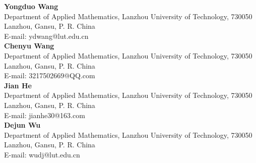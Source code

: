 \documentclass[11pt, twoside]{article}
\begin{document}
\textbf{Yongduo Wang}\\
Department of Applied Mathematics, Lanzhou University of Technology, 730050 Lanzhou, Gansu, P. R. China\\
E-mail: \textsf{ydwang@lut.edu.cn}\\[0.3cm]
\textbf{Chenyu Wang}\\
Department of Applied Mathematics, Lanzhou University of Technology, 730050 Lanzhou, Gansu, P. R. China\\
E-mail: \textsf{3217502669@QQ.com}\\[0.3cm]
\textbf{Jian He}\\
Department of Applied Mathematics, Lanzhou University of Technology, 730050 Lanzhou, Gansu, P. R. China\\
E-mail: \textsf{jianhe30@163.com}\\[0.3cm]
\textbf{Dejun Wu}\\
Department of Applied Mathematics, Lanzhou University of Technology, 730050 Lanzhou, Gansu, P. R. China\\
E-mail: \textsf{wudj@lut.edu.cn}\\[0.3cm]
\end{document}
